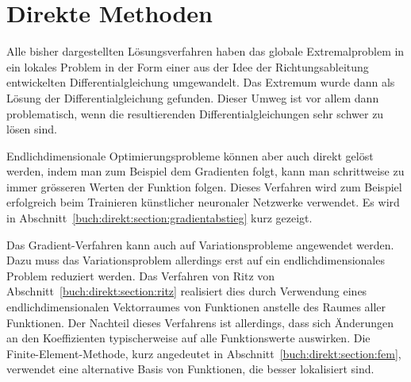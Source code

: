 %
%
%
\chapter{Direkte Methoden
\label{buch:chapter:direkt}}
Alle bisher dargestellten Lösungsverfahren haben das globale Extremalproblem
in ein lokales Problem in der Form einer aus der Idee der Richtungsableitung
entwickelten Differentialgleichung umgewandelt.
Das Extremum wurde dann als Lösung der Differentialgleichung gefunden.
Dieser Umweg ist vor allem dann problematisch, wenn die resultierenden
Differentialgleichungen sehr schwer zu lösen sind.

Endlichdimensionale Optimierungsprobleme können aber auch direkt gelöst
werden, indem man zum Beispiel dem Gradienten folgt, kann man schrittweise
zu immer grösseren Werten der Funktion folgen.
Dieses Verfahren wird zum Beispiel erfolgreich beim Trainieren
künstlicher neuronaler Netzwerke verwendet.
Es wird in Abschnitt~\ref{buch:direkt:section:gradientabstieg}
kurz gezeigt.

Das Gradient-Verfahren kann auch auf Variationsprobleme angewendet werden.
Dazu muss das Variationsproblem allerdings erst auf ein endlichdimensionales
Problem reduziert werden.
Das Verfahren von Ritz von Abschnitt~\ref{buch:direkt:section:ritz}
realisiert dies durch Verwendung eines endlichdimensionalen Vektorraumes
von Funktionen anstelle des Raumes aller Funktionen.
Der Nachteil dieses Verfahrens ist allerdings, dass sich Änderungen an
den Koeffizienten typischerweise auf alle Funktionswerte auswirken.
Die Finite-Element-Methode, kurz angedeutet in
Abschnitt~\ref{buch:direkt:section:fem}, verwendet eine alternative Basis
von Funktionen, die besser lokalisiert sind.





